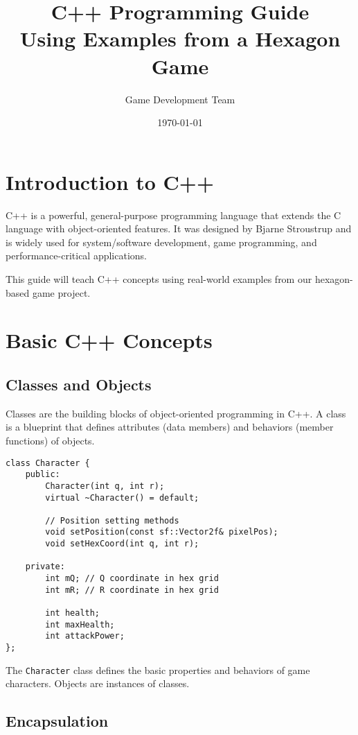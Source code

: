 \documentclass{article}
\title{C++ Programming Guide\\Using Examples from a Hexagon Game}
\author{Game Development Team}
\date{\today}
\begin{document}
\maketitle
\tableofcontents

\section{Introduction to C++}

C++ is a powerful, general-purpose programming language that extends the C language with object-oriented features. It was designed by Bjarne Stroustrup and is widely used for system/software development, game programming, and performance-critical applications.

This guide will teach C++ concepts using real-world examples from our hexagon-based game project.

\section{Basic C++ Concepts}

\subsection{Classes and Objects}

Classes are the building blocks of object-oriented programming in C++. A class is a blueprint that defines attributes (data members) and behaviors (member functions) of objects.

\begin{lstlisting}[caption=Basic Class Definition (Character.h)]
class Character {
    public:
        Character(int q, int r);
        virtual ~Character() = default;
        
        // Position setting methods
        void setPosition(const sf::Vector2f& pixelPos);
        void setHexCoord(int q, int r);
        
    private:
        int mQ; // Q coordinate in hex grid
        int mR; // R coordinate in hex grid
        
        int health;
        int maxHealth;
        int attackPower;
};
\end{lstlisting}

The \texttt{Character} class defines the basic properties and behaviors of game characters. Objects are instances of classes.

\subsection{Encapsulation}
\end{document}
